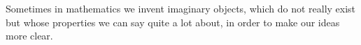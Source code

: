 Sometimes in mathematics we invent imaginary objects, which do not really exist
but whose properties we can say quite a lot about, in order to make our ideas
more clear.
